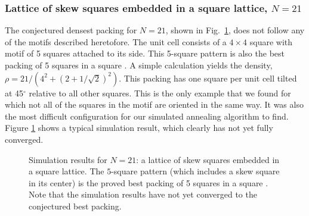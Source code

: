 \documentclass[aps]{revtex4}
\begin{document}
\subsubsection{Lattice of skew squares embedded in a square lattice, $N=21$}
The conjectured densest packing for  $N=21$, shown in Fig.\ \ref{fig:n21}, does not follow any of the motifs described heretofore. The unit cell consists of a $4 \times 4$ square with motif of 5 squares attached to its side.  This 5-square pattern is also the best packing of 5 squares in a square \cite{Friedman2002}.  A simple calculation yields the density, $\rho= 21/(4^2+(2+1/\sqrt{2})^2)$. This packing has one square per unit cell tilted at 45$^{\circ}$ relative to all other squares.  This is the only example that we found for which not all of the squares in the motif are oriented in the same way. It was also the most difficult configuration for our simulated annealing algorithm to find. Figure \ref{fig:n21} shows a typical simulation result, which clearly has not yet fully converged.

\begin{figure}[H]
\caption{\label{fig:n21}Simulation results for $N=21$: a lattice of skew squares embedded in a square lattice.  The $5$-square pattern (which includes a skew square in its center) is the proved best packing of 5 squares in a square \cite{Friedman2002}. Note that the simulation results have not yet converged to the conjectured best packing.} \end{figure}
\end{document}
